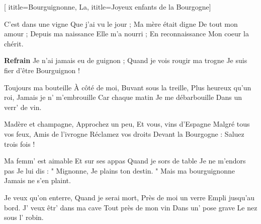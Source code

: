 [
ititle={Bourguignonne, La},
ititle={Joyeux enfants de la Bourgogne}]


\beginverse
C'est dans une vigne
Que j'ai vu le jour ;
Ma mère était digne
De tout mon amour ;
Depuis ma naissance
Elle m'a nourri ;
En reconnaissance
Mon coeur la chérit.
\endverse

\beginchorus 
\textbf {Refrain}
 {Je n'ai jamais eu de guignon ;} {Quand je vois rougir ma trogne } {Je suis fier d'être Bourguignon !}
\endchorus

\beginverse
Toujours ma bouteille
À côté de moi,
Buvant sous la treille,
Plus heureux qu'un roi,
Jamais je n' m'embrouille
Car chaque matin
Je me débarbouille
Dans un verr' de vin.
\endverse

\beginverse
Madère et champagne,
Approchez un peu,
Et vous, vins d'Espagne
Malgré tous vos feux,
Amis de l'ivrogne
Réclamez vos droits
Devant la Bourgogne :
Saluez trois fois !
\endverse

\beginverse
Ma femm' est aimable
Et sur ses appas
Quand je sors de table
Je ne m'endors pas
Je lui dis : " Mignonne,
Je plains ton destin. "
Mais ma bourguignonne
Jamais ne s'en plaint.
\endverse

\beginverse
Je veux qu'on enterre,
Quand je serai mort,
Près de moi un verre
Empli jusqu'au bord.
J' veux êtr' dans ma cave
Tout près de mon vin
Dans un' pose grave
Le nez sous l' robin.
\endverse

\endsong